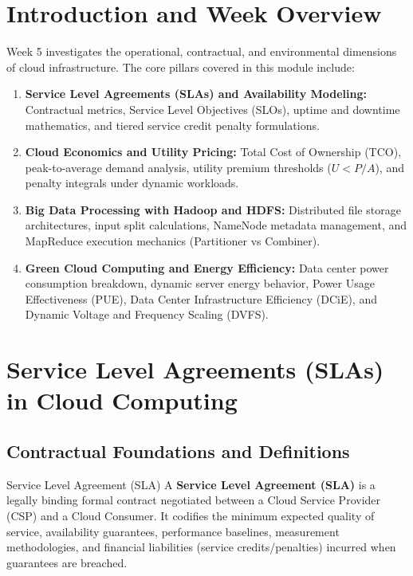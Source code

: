 \documentclass[11pt,a4paper,openany]{report}
\begin{document}
\section{Introduction and Week Overview}
Week 5 investigates the operational, contractual, and environmental dimensions of cloud infrastructure. The core pillars covered in this module include:
\begin{enumerate}[leftmargin=*]
  \item \textbf{Service Level Agreements (SLAs) and Availability Modeling:} Contractual metrics, Service Level Objectives (SLOs), uptime and downtime mathematics, and tiered service credit penalty formulations.
  \item \textbf{Cloud Economics and Utility Pricing:} Total Cost of Ownership (TCO), peak-to-average demand analysis, utility premium thresholds ($U < P/A$), and penalty integrals under dynamic workloads.
  \item \textbf{Big Data Processing with Hadoop and HDFS:} Distributed file storage architectures, input split calculations, NameNode metadata management, and MapReduce execution mechanics (Partitioner vs Combiner).
  \item \textbf{Green Cloud Computing and Energy Efficiency:} Data center power consumption breakdown, dynamic server energy behavior, Power Usage Effectiveness (PUE), Data Center Infrastructure Efficiency (DCiE), and Dynamic Voltage and Frequency Scaling (DVFS).
\end{enumerate}

\section{Service Level Agreements (SLAs) in Cloud Computing}
\subsection{Contractual Foundations and Definitions}
\begin{defbox}{Service Level Agreement (SLA)}
A \textbf{Service Level Agreement (SLA)} is a legally binding formal contract negotiated between a Cloud Service Provider (CSP) and a Cloud Consumer. It codifies the minimum expected quality of service, availability guarantees, performance baselines, measurement methodologies, and financial liabilities (service credits/penalties) incurred when guarantees are breached.
\end{defbox}
\end{document}
